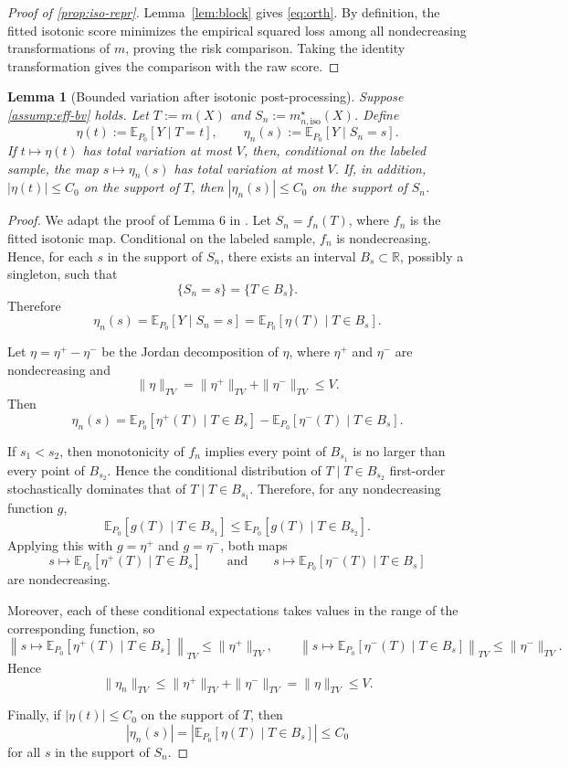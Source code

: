 \documentclass{article}
\theoremstyle{plain}
\newtheorem{lemma}{Lemma}
\theoremstyle{definition}
\newcommand{\E}{\mathbb{E}}
\newcommand{\1}{\mathbbm{1}}
\newcommand{\mhat}{m}
\begin{document}
\begin{proof}[Proof of \cref{prop:iso-repr}]
Lemma~\ref{lem:block} gives \eqref{eq:orth}.
By definition, the fitted isotonic score minimizes the empirical squared loss
among all nondecreasing transformations of \(\mhat\), proving the risk
comparison. Taking the identity transformation gives the comparison with the
raw score.
\end{proof}

\begin{lemma}[Bounded variation after isotonic post-processing]
\label{lem:bv-post}
Suppose \cref{assump:eff-bv} holds. Let \(T:=\mhat(X)\) and \(S_n:=m_{n,\mathrm{iso}}^\star(X)\). Define
\[
\eta(t):=\E_{P_0}[Y\mid T=t],
\qquad
\eta_n(s):=\E_{P_0}[Y\mid S_n=s].
\]
If \(t\mapsto \eta(t)\) has total variation at most \(V\), then, conditional on the labeled sample, the map \(s\mapsto \eta_n(s)\) has total variation at most \(V\). If, in addition, \(|\eta(t)|\le C_0\) on the support of \(T\), then \(|\eta_n(s)|\le C_0\) on the support of \(S_n\).
\end{lemma}
\begin{proof}
We adapt the proof of Lemma 6 in \cite{van2023causal}. Let \(S_n=f_n(T)\), where \(f_n\) is the fitted isotonic map. Conditional on the labeled sample, \(f_n\) is nondecreasing. Hence, for each \(s\) in the support of \(S_n\), there exists an interval \(B_s\subset \mathbb R\), possibly a singleton, such that
\[
\{S_n=s\}=\{T\in B_s\}.
\]
Therefore
\[
\eta_n(s)
=
\E_{P_0}[Y\mid S_n=s]
=
\E_{P_0}[\eta(T)\mid T\in B_s].
\]

Let \(\eta=\eta^+-\eta^-\) be the Jordan decomposition of \(\eta\), where \(\eta^+\) and \(\eta^-\) are nondecreasing and
\[
\|\eta\|_{TV}=\|\eta^+\|_{TV}+\|\eta^-\|_{TV}\le V.
\]
Then
\[
\eta_n(s)
=
\E_{P_0}[\eta^+(T)\mid T\in B_s]
-
\E_{P_0}[\eta^-(T)\mid T\in B_s].
\]

If \(s_1<s_2\), then monotonicity of \(f_n\) implies every point of \(B_{s_1}\) is no larger than every point of \(B_{s_2}\). Hence the conditional distribution of \(T\mid T\in B_{s_2}\) first-order stochastically dominates that of \(T\mid T\in B_{s_1}\). Therefore, for any nondecreasing function \(g\),
\[
\E_{P_0}[g(T)\mid T\in B_{s_1}]
\le
\E_{P_0}[g(T)\mid T\in B_{s_2}].
\]
Applying this with \(g=\eta^+\) and \(g=\eta^-\), both maps
\[
s\mapsto \E_{P_0}[\eta^+(T)\mid T\in B_s]
\qquad\text{and}\qquad
s\mapsto \E_{P_0}[\eta^-(T)\mid T\in B_s]
\]
are nondecreasing.

Moreover, each of these conditional expectations takes values in the range of the corresponding function, so
\[
\left\|s\mapsto \E_{P_0}[\eta^+(T)\mid T\in B_s]\right\|_{TV}
\le
\|\eta^+\|_{TV},
\qquad
\left\|s\mapsto \E_{P_0}[\eta^-(T)\mid T\in B_s]\right\|_{TV}
\le
\|\eta^-\|_{TV}.
\]
Hence
\[
\|\eta_n\|_{TV}
\le
\|\eta^+\|_{TV}+\|\eta^-\|_{TV}
=
\|\eta\|_{TV}
\le V.
\]

Finally, if \(|\eta(t)|\le C_0\) on the support of \(T\), then
\[
|\eta_n(s)|
=
\left|\E_{P_0}[\eta(T)\mid T\in B_s]\right|
\le C_0
\]
for all \(s\) in the support of \(S_n\).
\end{proof}
\end{document}
